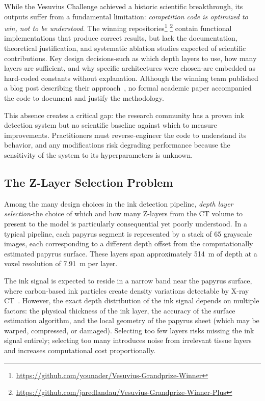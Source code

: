 While the Vesuvius Challenge achieved a historic scientific breakthrough, its outputs suffer from a fundamental limitation: \emph{competition code is optimized to win, not to be understood}. The winning repositories\footnote{\url{https://github.com/younader/Vesuvius-Grandprize-Winner}} \footnote{\url{https://github.com/jaredlandau/Vesuvius-Grandprize-Winner-Plus}} contain functional implementations that produce correct results, but lack the documentation, theoretical justification, and systematic ablation studies expected of scientific contributions. Key design decisions-such as which depth layers to use, how many layers are sufficient, and why specific architectures were chosen-are embedded as hard-coded constants without explanation. Although the winning team published a blog post describing their approach~\cite{naderink2024blog}, no formal academic paper accompanied the code to document and justify the methodology.

This absence creates a critical gap: the research community has a proven ink detection system but no scientific baseline against which to measure improvements. Practitioners must reverse-engineer the code to understand its behavior, and any modifications risk degrading performance because the sensitivity of the system to its hyperparameters is unknown.

\subsection{The Z-Layer Selection Problem}

Among the many design choices in the ink detection pipeline, \emph{depth layer selection}-the choice of which and how many Z-layers from the CT volume to present to the model is particularly consequential yet poorly understood. In a typical pipeline, each papyrus segment is represented by a stack of 65 grayscale images, each corresponding to a different depth offset from the computationally estimated papyrus surface. These layers span approximately 514~\textmu m of depth at a voxel resolution of 7.91~\textmu m per layer.

The ink signal is expected to reside in a narrow band near the papyrus surface, where carbon-based ink particles create density variations detectable by X-ray CT~\cite{mocella2015revealing, bukreeva2016virtual}. However, the exact depth distribution of the ink signal depends on multiple factors: the physical thickness of the ink layer, the accuracy of the surface estimation algorithm, and the local geometry of the papyrus sheet (which may be warped, compressed, or damaged). Selecting too few layers risks missing the ink signal entirely; selecting too many introduces noise from irrelevant tissue layers and increases computational cost proportionally.

